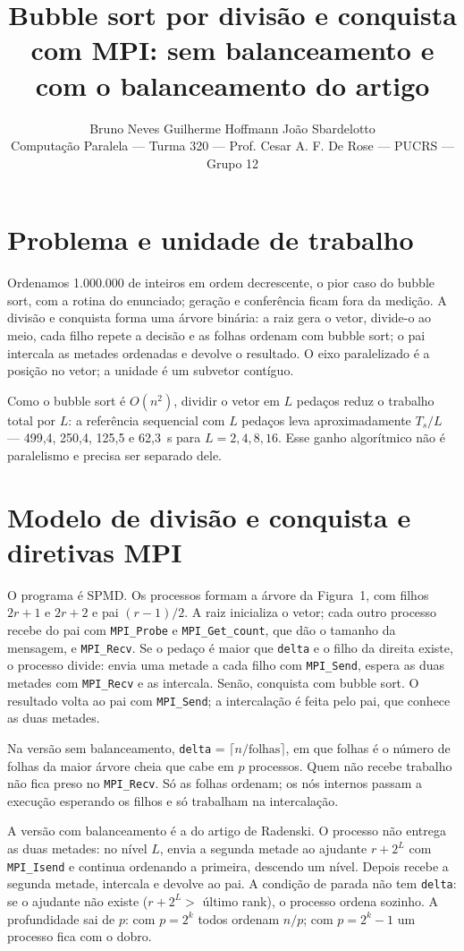 \documentclass[10pt,twocolumn]{article}
\title{\vspace{-1.5cm}\large Bubble sort por divisão e conquista com MPI:
sem balanceamento e com o balanceamento do artigo\vspace{-0.3cm}}
\author{
    \normalsize
    Bruno Neves \quad
    Guilherme Hoffmann \quad
    João Sbardelotto \\
    \small Computação Paralela --- Turma 320 --- Prof. Cesar A. F. De Rose ---
    PUCRS --- Grupo 12
}
\date{\vspace{-0.6cm}}
\begin{document}
\maketitle
\thispagestyle{empty}

\section{Problema e unidade de trabalho}

Ordenamos 1.000.000 de inteiros em ordem decrescente, o pior caso do bubble sort,
com a rotina do enunciado; geração e conferência ficam fora da medição. A
divisão e conquista forma uma árvore binária: a raiz gera o vetor, divide-o ao
meio, cada filho repete a decisão e as folhas ordenam com bubble sort; o pai
intercala as metades ordenadas e devolve o resultado. O eixo paralelizado é a
posição no vetor; a unidade é um subvetor contíguo.

Como o bubble sort é $O(n^2)$, dividir o vetor em $L$ pedaços reduz o trabalho
total por $L$: a referência sequencial com $L$ pedaços leva aproximadamente
$T_s/L$ --- 499,4, 250,4, 125,5 e 62,3~s para $L=2,4,8,16$. Esse ganho
algorítmico não é paralelismo e precisa ser separado dele.

\section{Modelo de divisão e conquista e diretivas MPI}

O programa é SPMD. Os processos formam a árvore da Figura~1, com filhos $2r+1$
e $2r+2$ e pai $(r-1)/2$. A raiz inicializa o vetor; cada outro processo recebe
do pai com \texttt{MPI\_Probe} e \texttt{MPI\_Get\_count}, que dão o tamanho da
mensagem, e \texttt{MPI\_Recv}. Se o pedaço é maior que \texttt{delta} e o filho
da direita existe, o processo divide: envia uma metade a cada filho com
\texttt{MPI\_Send}, espera as duas metades com \texttt{MPI\_Recv} e as
intercala. Senão, conquista com bubble sort. O resultado volta ao pai com
\texttt{MPI\_Send}; a intercalação é feita pelo pai, que conhece as duas metades.

Na versão sem balanceamento, \texttt{delta} = $\lceil n/\text{folhas}\rceil$, em
que folhas é o número de folhas da maior árvore cheia que cabe em $p$
processos. Quem não recebe trabalho não fica preso no \texttt{MPI\_Recv}.
Só as folhas ordenam; os nós
internos passam a execução esperando os filhos e só trabalham na intercalação.

A versão com balanceamento é a do artigo de Radenski. O processo não entrega as
duas metades: no nível $L$, envia a segunda metade ao ajudante $r+2^L$ com
\texttt{MPI\_Isend} e continua ordenando a primeira, descendo um nível. Depois
recebe a segunda metade, intercala e devolve ao pai. A condição de parada não tem
\texttt{delta}: se o ajudante não existe ($r+2^L >$ último rank), o processo
ordena sozinho. A profundidade sai de $p$: com $p=2^k$ todos ordenam $n/p$; com
$p=2^k-1$ um processo fica com o dobro.
\end{document}
